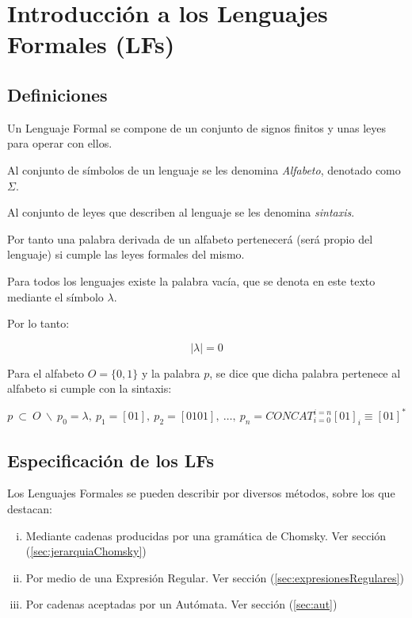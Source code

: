 \section{Introducción a los Lenguajes Formales (LFs)}

\subsection{Definiciones}

 Un Lenguaje Formal se compone de un conjunto de signos finitos y unas
leyes para operar con ellos.

 Al conjunto de símbolos de un lenguaje se les denomina \textit{Alfabeto},
denotado como $\Sigma$.

 Al conjunto de leyes que describen al lenguaje se les denomina
\textit{sintaxis}.

{\cor Por tanto una palabra derivada de un alfabeto pertenecerá (será propio del
lenguaje) si cumple las leyes formales del mismo.}

 Para todos los lenguajes existe la palabra vacía, que se denota en este
texto mediante el símbolo $\lambda$.

{\cor Por lo tanto:

\begin{equation}
|\lambda| = 0
\end{equation}

}



\ejem Para el alfabeto $O = \{0,1\}$ y la palabra $p$, se dice
que dicha palabra pertenece al alfabeto si cumple con la sintaxis:

\begin{equation}
p\ \subset\ O\ \backslash\ p_0 = \lambda,\ p_1 =[01],\ p_2=[0101],\ \ldots,\ p_n
= {CONCAT}_{i = 0}^{i = n}{{[01]}_i} \equiv {[01]}^*
\end{equation}


\subsection{Especificación de los LFs}

Los Lenguajes Formales se pueden describir por diversos métodos, sobre los que
destacan:

\begin{enumerate}[i.]
\item Mediante cadenas producidas por una gramática de Chomsky. Ver sección
(\ref{sec:jerarquiaChomsky})
\item Por medio de una Expresión Regular. Ver sección
(\ref{sec:expresionesRegulares})
\item Por cadenas aceptadas por un Autómata. Ver sección
(\ref{sec:aut})
\end{enumerate}

